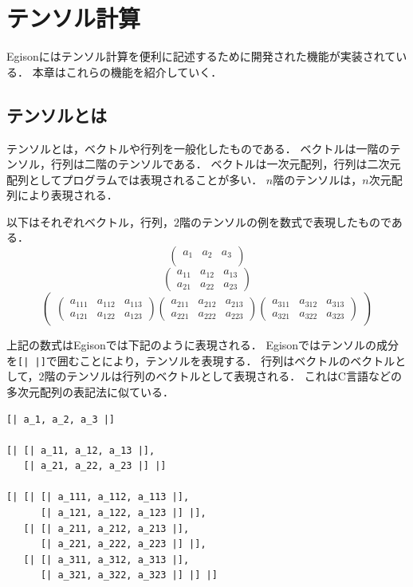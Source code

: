 \chapter{テンソル計算}\label{tensor}

Egisonにはテンソル計算を便利に記述するために開発された機能が実装されている．
本章はこれらの機能を紹介していく．

\section{テンソルとは}

テンソルとは，ベクトルや行列を一般化したものである．
ベクトルは一階のテンソル，行列は二階のテンソルである．
ベクトルは一次元配列，行列は二次元配列としてプログラムでは表現されることが多い．
$n$階のテンソルは，$n$次元配列により表現される．

以下はそれぞれベクトル，行列，$2$階のテンソルの例を数式で表現したものである．
$$
\begin{pmatrix}
a_{1} & a_{2} & a_{3}\\
\end{pmatrix}
$$
$$
\begin{pmatrix}
a_{11} & a_{12} & a_{13} \\
a_{21} & a_{22} & a_{23}
\end{pmatrix}
$$
$$
\begin{pmatrix}

\begin{pmatrix}
a_{111} & a_{112} & a_{113} \\
a_{121} & a_{122} & a_{123} 
\end{pmatrix}

\begin{pmatrix}
a_{211} & a_{212} & a_{213} \\
a_{221} & a_{222} & a_{223} 
\end{pmatrix}

\begin{pmatrix}
a_{311} & a_{312} & a_{313} \\
a_{321} & a_{322} & a_{323} 
\end{pmatrix}

\end{pmatrix}
$$

上記の数式はEgisonでは下記のように表現される．
Egisonではテンソルの成分を\lstinline![| |]!で囲むことにより，テンソルを表現する．
行列はベクトルのベクトルとして，$2$階のテンソルは行列のベクトルとして表現される．
これはC言語などの多次元配列の表記法に似ている．
\begin{lstlisting}[language=egison,numbers=none]
[| a_1, a_2, a_3 |]

[| [| a_11, a_12, a_13 |],
   [| a_21, a_22, a_23 |] |]

[| [| [| a_111, a_112, a_113 |],
      [| a_121, a_122, a_123 |] |],
   [| [| a_211, a_212, a_213 |],
      [| a_221, a_222, a_223 |] |],
   [| [| a_311, a_312, a_313 |],
      [| a_321, a_322, a_323 |] |] |]
\end{lstlisting}

